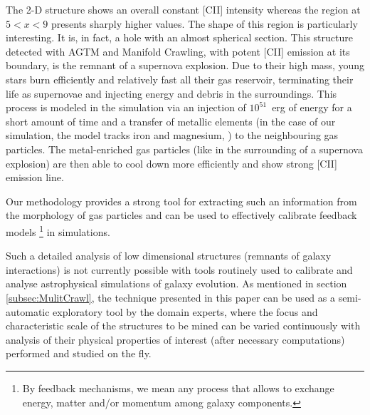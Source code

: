 The 2-D structure shows an overall constant [CII] intensity whereas the region at $5 < x < 9$ presents sharply higher values.
The shape of this region is particularly interesting. It is, in fact, a hole with an almost spherical section. This structure detected with AGTM and Manifold Crawling, with potent [CII] emission at its boundary, is the remnant of a supernova explosion. Due to their high mass, young stars burn efficiently and relatively fast all their gas reservoir, terminating their life as supernovae and injecting energy and debris in the surroundings.
This process is modeled in the simulation via an injection of $10^{51}$~erg of energy for a short amount of time and a transfer of metallic elements (in the case of our simulation, the model tracks iron and magnesium, \cite{DeRijcke2013}) to the neighbouring gas particles. The metal-enriched gas particles (like in the surrounding of a supernova explosion) are then able to cool down more efficiently and show strong [CII] emission line. 

Our methodology provides a strong tool for extracting such an information from the morphology of gas particles and can be used to effectively calibrate feedback models \footnote{By feedback mechanisms, we mean any process that allows to exchange energy, matter and/or momentum among galaxy components.} in simulations.

Such a detailed analysis of low dimensional structures (remnants of galaxy interactions) is not currently possible with tools routinely used to calibrate and analyse astrophysical simulations of galaxy evolution.
As mentioned in section \ref{subsec:MulitCrawl}, the technique presented in this paper can be used as a semi-automatic exploratory tool by the domain experts, where the focus and characteristic scale of the structures to be mined can be varied continuously with analysis of their physical properties of interest (after necessary computations) performed and studied on the fly.
